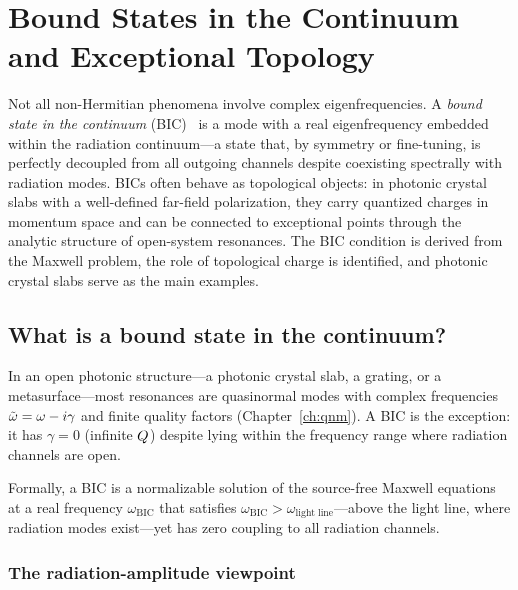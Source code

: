 \chapter{Bound States in the Continuum and Exceptional Topology}
\label{ch:bic-topology}

\begin{chapterlead}
Not all non-Hermitian phenomena involve complex eigenfrequencies. A
\emph{bound state in the continuum} (BIC)~\cite{hsu2016bound,koshelev2018nonradiating,kang2023applications,koshelev2018asymmetric,kang2022merging,bai2024recovery,gao2024degenerate} is a mode with a real
eigenfrequency embedded within the radiation continuum---a state that,
by symmetry or fine-tuning, is perfectly decoupled from all outgoing
channels despite coexisting spectrally with radiation modes. BICs often
behave as topological objects: in photonic crystal slabs with a
well-defined far-field polarization, they carry quantized charges in
momentum space and can be connected to exceptional points through the
analytic structure of open-system resonances. The BIC condition is
derived from the Maxwell problem, the role of topological charge is
identified, and photonic crystal slabs serve as the main examples.
\end{chapterlead}


\section{What is a bound state in the continuum?}
\label{sec:bic-definition}

In an open photonic structure---a photonic crystal slab, a grating, or
a metasurface---most resonances are quasinormal modes with complex
frequencies $\tilde{\omega} = \omega - i\gamma$ and finite quality factors
(Chapter~\ref{ch:qnm}). A BIC is the exception: it has $\gamma = 0$
(infinite $Q$) despite lying within the frequency range where
radiation channels are open.

Formally, a BIC is a normalizable solution of the source-free Maxwell
equations at a real frequency $\omega_{\mathrm{BIC}}$ that satisfies
$\omega_{\mathrm{BIC}} > \omega_{\mathrm{light\;line}}$---above the
light line, where radiation modes exist---yet has zero coupling to all
radiation channels.

\subsection{The radiation-amplitude viewpoint}
\label{ssec:radiation-amplitude}

